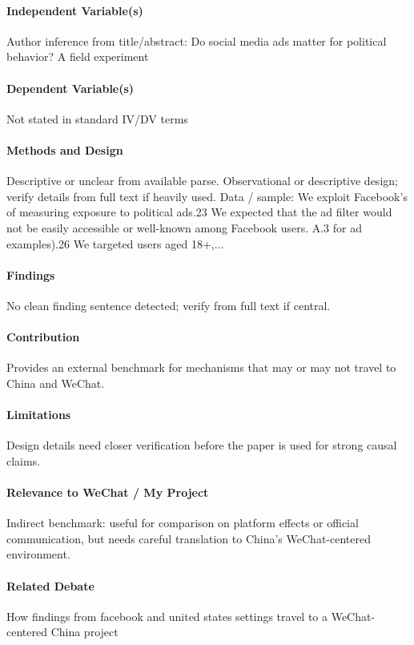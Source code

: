 \documentclass[12pt]{article}
\begin{document}
\paragraph{Independent Variable(s)} Author inference from title/abstract: Do social media ads matter for political behavior? A field experiment

\paragraph{Dependent Variable(s)} Not stated in standard IV/DV terms

\paragraph{Methods and Design} Descriptive or unclear from available parse. Observational or descriptive design; verify details from full text if heavily used. Data / sample: We exploit Facebook's of measuring exposure to political ads.23 We expected that the ad filter would not be easily accessible or well-known among Facebook users. A.3 for ad examples).26 We targeted users aged 18+,...

\paragraph{Findings} No clean finding sentence detected; verify from full text if central.

\paragraph{Contribution} Provides an external benchmark for mechanisms that may or may not travel to China and WeChat.

\paragraph{Limitations} Design details need closer verification before the paper is used for strong causal claims.

\paragraph{Relevance to WeChat / My Project} Indirect benchmark: useful for comparison on platform effects or official communication, but needs careful translation to China's WeChat-centered environment.

\paragraph{Related Debate} How findings from facebook and united states settings travel to a WeChat-centered China project
\end{document}
